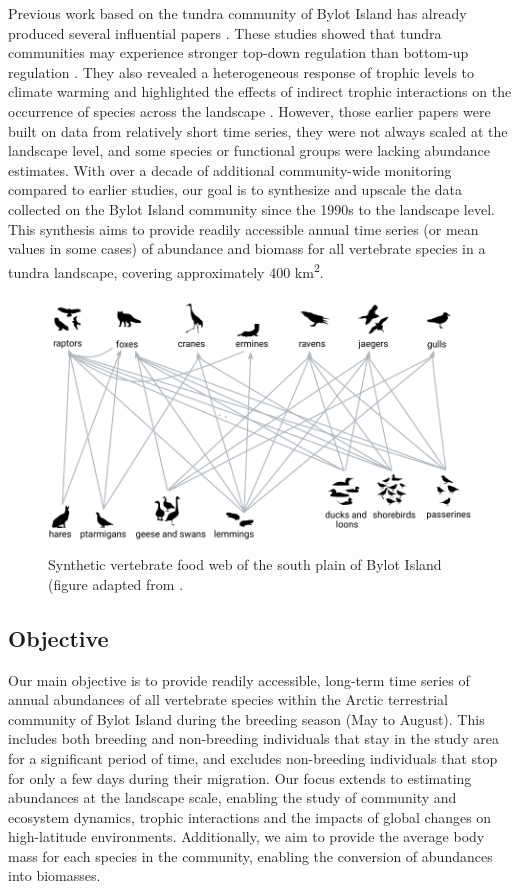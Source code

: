 \documentclass[a4paper,twoside,10pt]{article}
\begin{document}
Previous work based on the tundra community of Bylot Island  has already produced several influential papers \citep{gauthier2011, legagneux2012, legagneux2014,hutchison2020, duchesne2021, gauthier2024b}. These studies showed that tundra communities may experience stronger top-down regulation than bottom-up regulation \citep{legagneux2012, legagneux2014}. They also revealed a heterogeneous response of trophic levels to climate warming \citep{gauthier2013} and highlighted the effects of indirect trophic interactions on the occurrence of species across the landscape \citep{duchesne2021}. However, those earlier papers were built on data from relatively short time series, they were not always scaled at the landscape level, and some species or functional groups were lacking abundance estimates. With over a decade of additional community-wide monitoring compared to earlier studies, our goal is to synthesize and upscale the data collected on the Bylot Island community since the 1990s to the landscape level. This synthesis aims to provide readily accessible annual time series (or mean values in some cases) of abundance and biomass for all vertebrate species in a tundra landscape, covering approximately 400 km\textsuperscript{2}. 

\begin{figure}[H]
\centering
\includegraphics[width=0.75\linewidth]{figures/food_web.pdf} 
\caption{Synthetic vertebrate food web of the south plain of Bylot Island (figure adapted from \citet{gauthier2011}.}
\label{figure:food_web}
\end{figure}

\subsection*{Objective}
Our main objective is to provide readily accessible, long-term time series of annual abundances of all vertebrate species within the Arctic terrestrial community of Bylot Island during the breeding season (May to August). This includes both breeding and non-breeding individuals that stay in the study area for a significant period of time, and excludes non-breeding individuals that stop for only a few days during their migration. Our focus extends to estimating abundances at the landscape scale, enabling the study of community and ecosystem dynamics, trophic interactions and the impacts of global changes on high-latitude environments. Additionally, we aim to provide the average body mass for each species in the community, enabling the conversion of abundances into biomasses.
\newpage
\end{document}
